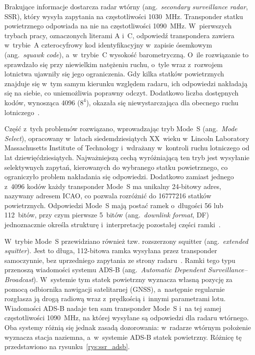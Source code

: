 Brakujące informacje dostarcza radar wtórny (ang.~\textit{secondary surveillance radar}, SSR), który wysyła zapytania na częstotliwości \SI{1030}{\mega\hertz}. Transponder statku powietrznego odpowiada na nie na częstotliwości \SI{1090}{\mega\hertz}. W~pierwszych trybach pracy, oznaczonych literami A i~C, odpowiedź transpondera zawiera w~trybie~A czterocyfrowy kod identyfikacyjny w~zapisie ósemkowym (ang.~\textit{squawk code}), a~w~trybie~C wysokość barometryczną. O~ile rozwiązanie to sprawdzało się przy niewielkim natężeniu ruchu, o~tyle wraz z~rozwojem lotnictwa ujawniły się jego ograniczenia. Gdy kilka statków powietrznych znajduje się w~tym samym kierunku względem radaru, ich odpowiedzi nakładają się na siebie, co uniemożliwia poprawny odczyt. Dodatkowo liczba dostępnych kodów, wynosząca \num{4096} ($8^4$), okazała się niewystarczająca dla obecnego ruchu lotniczego~\cite{sun2021}.

Część z~tych problemów rozwiązano, wprowadzając tryb Mode~S (ang.~\textit{Mode Select}), opracowany w~latach siedemdziesiątych XX~wieku w~Lincoln Laboratory Massachusetts Institute of Technology i~wdrażany w~kontroli ruchu lotniczego od lat dziewięćdziesiątych. Najważniejszą cechą wyróżniającą ten tryb jest wysyłanie selektywnych zapytań, kierowanych do wybranego statku powietrznego, co ograniczyło problem nakładania się odpowiedzi. Dodatkowo zamiast jednego z~\num{4096} kodów każdy transponder Mode~S ma unikalny 24-bitowy adres, nazywany adresem ICAO, co pozwala rozróżnić do \num{16777216} statków powietrznych. Odpowiedzi Mode~S mają postać ramek o~długości 56 lub 112~bitów, przy czym pierwsze 5~bitów (ang.~\textit{downlink format}, DF) jednoznacznie określa strukturę i~interpretację pozostałej części ramki~\cite{sun2021}.

W~trybie Mode~S przewidziano również tzw. rozszerzony squitter (ang.~\textit{extended squitter}). Jest to długa, 112-bitowa ramka wysyłana przez transponder samoczynnie, bez uprzedniego zapytania ze strony radaru~\cite{sun2021}. Ramki tego typu przenoszą wiadomości systemu ADS-B (ang.~\textit{Automatic Dependent Surveillance--Broadcast}). W~systemie tym statek powietrzny wyznacza własną pozycję za pomocą odbiornika nawigacji satelitarnej (GNSS), a~następnie regularnie rozgłasza ją drogą radiową wraz z~prędkością i~innymi parametrami lotu. Wiadomości ADS-B nadaje ten sam transponder Mode~S i~na tej samej częstotliwości \SI{1090}{\mega\hertz}, na której wysyłane są odpowiedzi dla radaru wtórnego. Oba systemy różnią się jednak zasadą dozorowania: w~radarze wtórnym położenie wyznacza stacja naziemna, a~w~systemie ADS-B statek powietrzny. Różnicę tę przedstawiono na rysunku~\ref{rys:ssr_adsb}.
 
